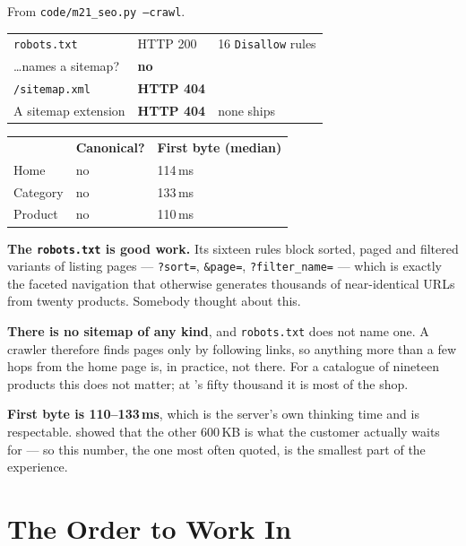 \begin{measured}
From \texttt{code/m21\_seo.py --crawl}.

\smallskip
\begin{tabular}{@{}L{6.4cm}L{3.0cm}L{4.4cm}@{}}
\texttt{robots.txt} & HTTP 200 & 16 \texttt{Disallow} rules \\
\dots names a sitemap? & \textbf{no} & \\
\texttt{/sitemap.xml} & \textbf{HTTP 404} & \\
A sitemap extension & \textbf{HTTP 404} & none ships \\
\end{tabular}

\smallskip
\begin{tabular}{@{}L{4.4cm}L{4.4cm}L{4.4cm}@{}}
& \textbf{Canonical?} & \textbf{First byte (median)} \\
Home & no & 114\,ms \\
Category & no & 133\,ms \\
Product & no & 110\,ms \\
\end{tabular}

\smallskip
\textbf{The \texttt{robots.txt} is good work.} Its sixteen rules block sorted,
paged and filtered variants of listing pages --- \texttt{?sort=},
\texttt{\&page=}, \texttt{?filter\_name=} --- which is exactly the faceted
navigation that otherwise generates thousands of near-identical URLs from
twenty products. Somebody thought about this.

\smallskip
\textbf{There is no sitemap of any kind}, and \texttt{robots.txt} does not name
one. A crawler therefore finds pages only by following links, so anything more
than a few hops from the home page is, in practice, not there. For a catalogue
of nineteen products this does not matter; at 's fifty
thousand it is most of the shop.

\smallskip
\textbf{First byte is 110--133\,ms}, which is the server's own thinking time
and is respectable.  showed that the other 600\,KB is what the
customer actually waits for --- so this number, the one most often quoted, is
the smallest part of the experience.
\end{measured}

\section{The Order to Work In}

